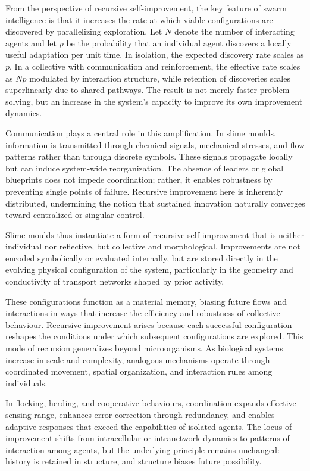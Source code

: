 \documentclass[11pt]{article}
\begin{document}
From the perspective of recursive self-improvement, the key feature of swarm intelligence is that it increases the rate at which viable configurations are discovered by parallelizing exploration. Let $N$ denote the number of interacting agents and let $p$ be the probability that an individual agent discovers a locally useful adaptation per unit time. In isolation, the expected discovery rate scales as $p$. In a collective with communication and reinforcement, the effective rate scales as $Np$ modulated by interaction structure, while retention of discoveries scales superlinearly due to shared pathways. The result is not merely faster problem solving, but an increase in the system’s capacity to improve its own improvement dynamics.

Communication plays a central role in this amplification. In slime moulds, information is transmitted through chemical signals, mechanical stresses, and flow patterns rather than through discrete symbols. These signals propagate locally but can induce system-wide reorganization. The absence of leaders or global blueprints does not impede coordination; rather, it enables robustness by preventing single points of failure. Recursive improvement here is inherently distributed, undermining the notion that sustained innovation naturally converges toward centralized or singular control.

Slime moulds thus instantiate a form of recursive self-improvement that is neither individual nor reflective, but collective and morphological. Improvements are not encoded symbolically or evaluated internally, but are stored directly in the evolving physical configuration of the system, particularly in the geometry and conductivity of transport networks shaped by prior activity.

These configurations function as a material memory, biasing future flows and interactions in ways that increase the efficiency and robustness of collective behaviour. Recursive improvement arises because each successful configuration reshapes the conditions under which subsequent configurations are explored. This mode of recursion generalizes beyond microorganisms. As biological systems increase in scale and complexity, analogous mechanisms operate through coordinated movement, spatial organization, and interaction rules among individuals.

In flocking, herding, and cooperative behaviours, coordination expands effective sensing range, enhances error correction through redundancy, and enables adaptive responses that exceed the capabilities of isolated agents. The locus of improvement shifts from intracellular or intranetwork dynamics to patterns of interaction among agents, but the underlying principle remains unchanged: history is retained in structure, and structure biases future possibility.
\end{document}
